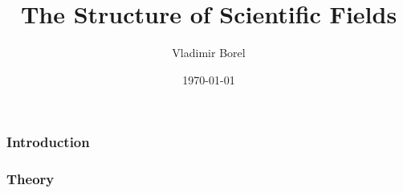\documentclass[xcolor=dvipsnames,notes]{beamer}
\title{The Structure of Scientific Fields}
\author{Vladimir Borel}
\institute{University of California, Riverside}
\date{\today}
\begin{document}
\frame{\titlepage}

\begin{frame}
\frametitle{Introduction}

\end{frame}

\begin{frame}
\frametitle{Theory}

\end{frame}

% 

% 

% 







\end{document}
